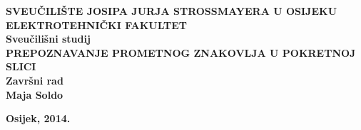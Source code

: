 \newpage
\begin{titlepage}
\begin{center}

\textbf{\MakeUppercase{\large 
    Sveučilište Josipa Jurja Strossmayera u Osijeku}}\\[0.2cm]

\textbf{\MakeUppercase{\large Elektrotehnički fakultet}}\\[0.8cm]
\textbf{\large Sveučilišni studij}\\ [5cm]

\textbf{\MakeUppercase{\Large 
    Prepoznavanje prometnog znakovlja u pokretnoj slici}}\\ [1cm]

\textbf{\large Završni rad}\\  [5 cm] 

\textbf{\Large Maja Soldo}\\ [0.5cm] 

\vfill

\textbf{\large Osijek, 2014.} \\

\end{center}
\end{titlepage}
